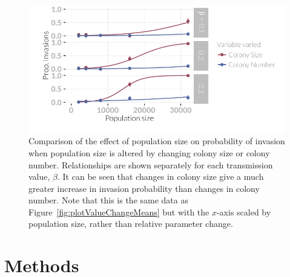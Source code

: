 \begin{knitrout}\footnotesize
{}\color{fgcolor}\begin{figure}[t]

{\centering \includegraphics[width=\textwidth]{figure/plotTransMeans-1} 

}

\caption[Comparison of the probability of invasion when population size is altered by changing colony size or colony number.]{
Comparison of the effect of population size on probability of invasion when population size is altered by changing colony size or colony number.
Relationships are shown separately for each transmission value, $\beta$.
It can be seen that changes in colony size give a much greater increase in invasion probability than changes in colony number.
Note that this is the same data as Figure~\ref{fig:plotValueChangeMeans} but with the $x$-axis scaled by population size, rather than relative parameter change.
}\label{fig:plotTransMeans}
\end{figure}


\end{knitrout}







\section{Methods}






